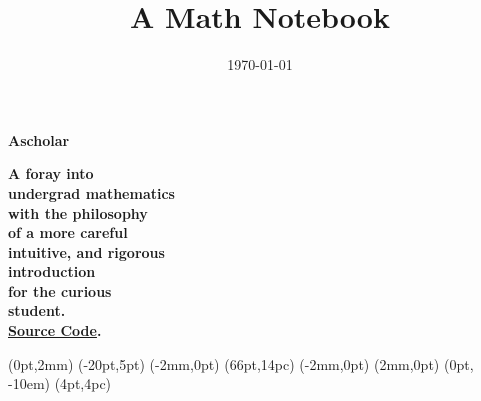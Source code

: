 \documentclass[twoside, 12pt]{memoir}
\date{\today}
\title{A Math Notebook}
\begin{document}

\pagestyle{empty}

  \NewCoffin \result
  \NewCoffin \aaa
  \NewCoffin \bbb
  \NewCoffin \ccc
  \NewCoffin \ddd
  \NewCoffin \eee
  \NewCoffin \fff
  \NewCoffin {}
  \NewCoffin {}
  \NewCoffin {}

\SetHorizontalCoffin \result {}
\SetHorizontalCoffin {}
\SetHorizontalCoffin {}
\SetHorizontalCoffin {}
\SetHorizontalCoffin {}
\SetVerticalCoffin \eee {180pt}
                 {\raggedleft\fontsize{31}{36}\sffamily\bfseries
                 Ascholar}
\SetVerticalCoffin \fff {140pt}
                 {\raggedright \fontsize{13}{14}\sffamily\bfseries
                       A foray into \\
                       undergrad mathematics \\
                       with the philosophy \\
                        of a more careful\\
                       intuitive, and rigorous \\
                       introduction\\
                       for the curious \\
                       student. \\
                       \href{https://github.com/Anonscholar}{Source Code}.\\}

\RotateCoffin {}
\RotateCoffin {}

\SetHorizontalCoffin {}
\SetHorizontalCoffin {}
\SetHorizontalCoffin {}


\JoinCoffins \result                \aaa
\JoinCoffins {} (0pt,2mm)
\JoinCoffins {} \bbb     [B,r](-20pt,5pt)
\JoinCoffins {} (-2mm,0pt)
\JoinCoffins {} \ccc     [B,l](66pt,14pc)
\JoinCoffins {} \fff     [t,r](-2mm,0pt)
\JoinCoffins {} (2mm,0pt)
\JoinCoffins {} \eee     [B,r] (0pt, -10em)
\JoinCoffins {} \ddd     [B,r](4pt,4pc)
\end{document}
